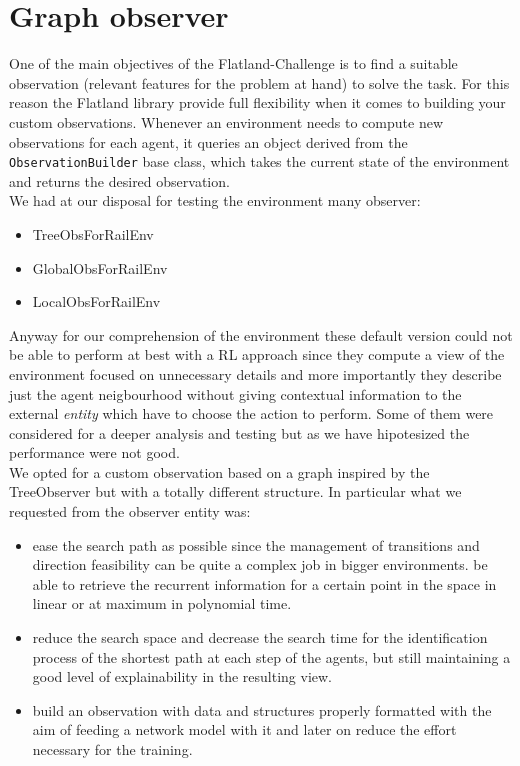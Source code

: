 \section{Graph observer}
One of the main objectives of the Flatland-Challenge is to find a suitable observation (relevant features for the problem at hand) to solve the task. For this reason the Flatland library provide full flexibility when it comes to building your custom observations. Whenever an environment needs to compute new observations for each agent, it queries an object derived from the \texttt{ObservationBuilder} base class, which takes the current state of the environment and returns the desired observation.\\
We had at our disposal for testing the environment many observer:
\begin{itemize}
\item TreeObsForRailEnv
\item GlobalObsForRailEnv
\item LocalObsForRailEnv
\end{itemize}
Anyway for our comprehension of the environment these default version could not be able to perform at best with a RL approach since they compute a view of the environment focused on unnecessary details and more importantly they describe just the agent neigbourhood without giving contextual information to the external \textit{entity} which have to choose the action to perform. Some of them were considered for a deeper analysis and testing but as we have hipotesized the performance were not good.\\
We opted for a custom observation based on a graph inspired by the TreeObserver but with a totally different structure. In particular what we requested from the observer entity was:
\begin{itemize}
    \item ease the search path as possible since the management of transitions and direction feasibility can be quite a complex job in bigger environments.
    \reduce be able to retrieve the recurrent information for a certain point in the space in linear or at maximum in polynomial time.
    \item reduce the search space and decrease the search time for the identification process of the shortest path at each step of the agents, but still maintaining a good level of explainability in the resulting view.
    \item build an observation with data and structures properly formatted with the aim of feeding a network model with it and later on reduce the effort necessary for the training.
\end{itemize}

